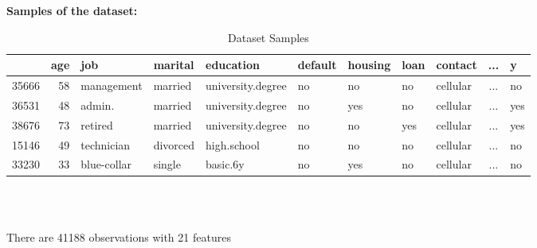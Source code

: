 \documentclass[11pt,a4paper]{article}
\begin{document}
    \noindent
    \textbf{Samples of the dataset:}
    \begin{table}[ht]
        \centering
        \begin{tabular}{lrlllllllcl}
            {} &  age &          job &   marital &          education & default & housing & loan &   contact & ... & y\\
            
            \hline \hline
            
            35666 &   58 &   management &   married &  university.degree &      no &      no &   no &  cellular & ... & no \\
            36531 &   48 &       admin. &   married &  university.degree &      no &     yes &   no &  cellular & ... & yes \\
            38676 &   73 &      retired &   married &  university.degree &      no &      no &  yes &  cellular & ... & yes \\
            15146 &   49 &   technician &  divorced &        high.school &      no &      no &   no &  cellular & ... & no \\
            33230 &   33 &  blue-collar &    single &           basic.6y &      no &     yes &   no &  cellular & ... & no \\
        \end{tabular} \\ \\
        \caption{Dataset Samples}
        \label{tab:samples}
    \end{table}
    
    \noindent
    There are 41188 observations with 21 features
        
    
\end{document}
